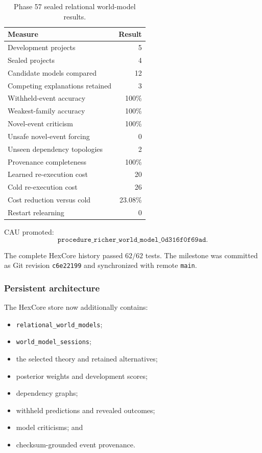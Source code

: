 \begin{table}[htbp]
\centering
\begin{tabular}{lr}
\hline
\textbf{Measure} & \textbf{Result}\\
\hline
Development projects & 5\\
Sealed projects & 4\\
Candidate models compared & 12\\
Competing explanations retained & 3\\
Withheld-event accuracy & 100\%\\
Weakest-family accuracy & 100\%\\
Novel-event criticism & 100\%\\
Unsafe novel-event forcing & 0\\
Unseen dependency topologies & 2\\
Provenance completeness & 100\%\\
Learned re-execution cost & 20\\
Cold re-execution cost & 26\\
Cost reduction versus cold & 23.08\%\\
Restart relearning & 0\\
\hline
\end{tabular}
\caption{Phase 57 sealed relational world-model results.}
\label{tab:phase57-results}
\end{table}

CAU promoted:
\[
\texttt{procedure\_richer\_world\_model\_0d316f0f69ad}.
\]

The complete HexCore history passed \(62/62\) tests.  The milestone was
committed as Git revision \texttt{c6e22199} and synchronized with remote
\texttt{main}.

\subsubsection{Persistent architecture}

The HexCore store now additionally contains:
\begin{itemize}
    \item \texttt{relational\_world\_models};
    \item \texttt{world\_model\_sessions};
    \item the selected theory and retained alternatives;
    \item posterior weights and development scores;
    \item dependency graphs;
    \item withheld predictions and revealed outcomes;
    \item model criticisms; and
    \item checksum-grounded event provenance.
\end{itemize}

